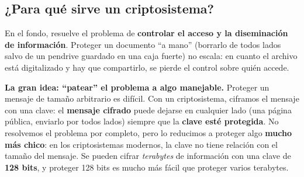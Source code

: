 \documentclass[11pt,a4paper]{article}
\begin{document}
\subsection{¿Para qué sirve un criptosistema?}
En el fondo, resuelve el problema de \textbf{controlar el acceso y la diseminación de
información}. Proteger un documento ``a mano'' (borrarlo de todos lados salvo de un pendrive
guardado en una caja fuerte) no escala: en cuanto el archivo está digitalizado y hay que
compartirlo, se pierde el control sobre quién accede.

\begin{notebox}
\textbf{La gran idea: ``patear'' el problema a algo manejable.} Proteger un mensaje de tamaño
arbitrario es difícil. Con un criptosistema, ciframos el mensaje con una clave: el
\textbf{mensaje cifrado} puede dejarse en cualquier lado (una página pública, enviarlo por
todos lados) siempre que la \textbf{clave esté protegida}. No resolvemos el problema por
completo, pero lo reducimos a proteger algo \textbf{mucho más chico}: en los criptosistemas
modernos, la clave no tiene relación con el tamaño del mensaje. Se pueden cifrar
\emph{terabytes} de información con una clave de \textbf{128 bits}, y proteger 128 bits es
mucho más fácil que proteger varios terabytes.
\end{notebox}
\end{document}
